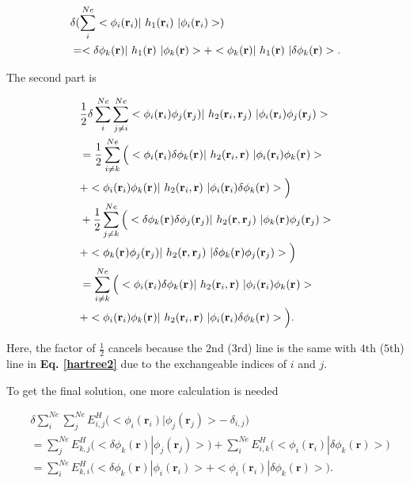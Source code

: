 \documentclass[a4paper, 12pt, titlepage,oneside,drop]{kthesis}
\begin{document}
\begin{equation}\begin{split}\label{hartree1}
&  \delta ( \sum\limits_i^{{Ne}} <\bwff<i><i> |\ h_1(\textbf{r}_{i})  \ | \bwff<i><i> > )  \\
& =  < \delta \phi_{{k}}(\textbf{r}) |\ h_1(\textbf{r})  \ |  \phi_{{k}}(\textbf{r}) >  +  < \phi_{{k}}(\textbf{r}) |\ h_1(\textbf{r})  \ | \delta \phi_{{k}}(\textbf{r}) >. 
\end{split}\end{equation}

The second part is

\begin{equation}\begin{split}\label{hartree2}
& \frac{1}{2} \delta \sum\limits_i^{{Ne}} \sum\limits_{j \neq i}^{{Ne}} <\bwff<i><i> \bwff<j><j>|\ h_2(\textbf{r}_{i},\textbf{r}_{j}) \ | \bwff<i><i> \bwff<j><j>> \\
& = \frac{1}{2}  \sum\limits_{i \neq k}^{{Ne}} \Big( <\bwff<i><i>  \delta \bwff<k><>|\ h_2(\textbf{r}_{i},\textbf{r}) \ | \bwff<i><i> \bwff<k><>> \\
& + <\bwff<i><i>  \bwff<k><>|\ h_2(\textbf{r}_{i},\textbf{r}) \ | \bwff<i><i> \delta \bwff<k><>> \Big) \\
& + \frac{1}{2}  \sum\limits_{j \neq k}^{{Ne}} \Big( <\delta \bwff<k><>  \delta \bwff<j><j>|\ h_2(\textbf{r},\textbf{r}_{j}) \ | \bwff<k><> \bwff<j><j>> \\
& + < \bwff<k><>  \bwff<j><j>|\ h_2(\textbf{r},\textbf{r}_{j}) \ | \delta \bwff<k><> \bwff<j><j>> \Big) \\
& =   \sum\limits_{i \neq k}^{{Ne}} \Big( <\bwff<i><i>  \delta \bwff<k><>|\ h_2(\textbf{r}_{i},\textbf{r}) \ | \bwff<i><i> \bwff<k><>> \\
& + <\bwff<i><i>  \bwff<k><>|\ h_2(\textbf{r}_{i},\textbf{r}) \ | \bwff<i><i> \delta \bwff<k><>> \Big). 
\end{split}\end{equation}

Here, the factor of $\frac{1}{2}$ cancels because the $2$nd ($3$rd) line is the same with $4$th ($5$th) line in \textbf{Eq. \ref{hartree2}} due to the exchangeable indices of $i$ and $j$. 

To get the final solution, one more calculation is needed 

\begin{equation} \begin{split}\label{xixihaha}
& \delta \sum\limits_i^{{Ne}} \sum\limits_j^{{Ne}} E_{i,j}^{{H}} \Big(<\phi_{i}(\textbf{r}_{i}) | \phi_{j}(\textbf{r}_{j}) > - \ \delta_{i,j}\Big) \\
& = \sum\limits_j^{{Ne}} E_{k,j}^{{H}} \Big(< \delta \phi_{k}(\textbf{r}) | \phi_{j}(\textbf{r}_{j}) > \Big) + \sum\limits_i^{{Ne}} E_{i,k}^{{H}} \Big(<\phi_{i}(\textbf{r}_{i}) | \delta \phi_{k}(\textbf{r}) >\Big) \\
& = \sum\limits_i^{{Ne}} E_{k,i}^{{H}} \Big(< \delta \phi_{k}(\textbf{r}) | \phi_{i}(\textbf{r}_{i}) >  + <\phi_{i}(\textbf{r}_{i}) | \delta \phi_{k}(\textbf{r}) >\Big).
\end{split}
\end{equation}
\end{document}
